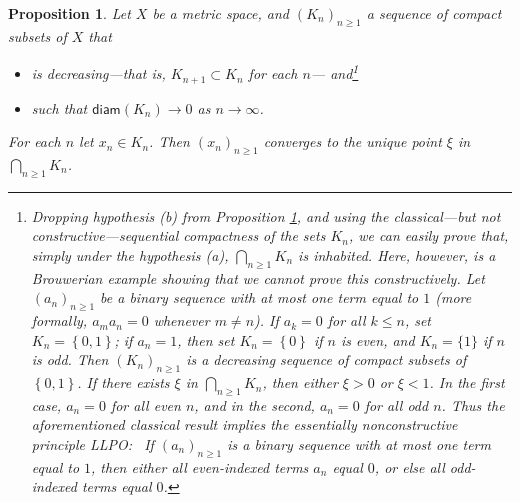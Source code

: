 \documentclass[10pt,a4paper]{amsart}
\newtheorem{proposition}{Proposition}
\begin{document}
\begin{proposition}
\label{may04p1}Let $X$ be a metric space, and $\left(  K_{n}\right)
_{n\geqslant1}$ a sequence of compact subsets of $X$ that

\begin{itemize}
\item[\emph{(a)}] is decreasing---that is, $K_{n+1}\subset K_{n}$ for each
$n$--- and\footnote{%
\normalfont\sf
Dropping hypothesis (b) from Proposition \ref{may04p1}, and using the
classical---but not constructive---sequential compactness of the sets $K_{n}$,
we can easily prove that, simply under the hypothesis (a), $%
{\textstyle\bigcap_{n\geq1}}
K_{n}$ is inhabited. Here, however, is a Brouwerian example showing that we
cannot prove this constructively. Let $\left(  a_{n}\right)  _{n\geq1}$ be a
binary sequence with at most one term equal to $1$ (more formally, $a_{m}%
a_{n}=0$ whenever $m\neq n$). If $a_{k}=0$ for all $k\leq n$, set
$K_{n}=\left\{  0,1\right\}  $; if $a_{n}=1$, then set $K_{n}=\left\{
0\right\}  $ if $n$ is even, and $K_{n}=\{1\}$ if $n$ is odd. Then $\left(
K_{n}\right)  _{n\geq1}$ is a decreasing sequence of compact subsets of
$\left\{  0,1\right\}  $. If there exists $\xi$ in $%
{\textstyle\bigcap_{n\geq1}}
K_{n}$, then either $\xi>0$ or $\xi<1$. In the first case, $a_{n}=0$ for all
even $n$, and in the second, $a_{n}=0$ for all odd $n$. Thus the
aforementioned classical result implies the essentially nonconstructive
principle \textsf{LLPO: \ }If $\left(  a_{n}\right)  _{n\geq1}$ is a binary
sequence with at most one term equal to $1$, then either all even-indexed
terms $a_{n}$ equal $0$, or else all odd-indexed terms equal $0$.}

\item[\emph{(b)}] such that $\mathsf{diam}(K_{n})\rightarrow0$ as
$n\rightarrow\infty$.
\end{itemize}

%

\noindent
For each $n$ let $x_{n}\in K_{n}$. Then $\left(  x_{n}\right)  _{n\geqslant1}$
converges to the unique point $\xi$ in $%
{\textstyle\bigcap_{n\geqslant1}}
K_{n}$.
\end{proposition}
\end{document}
